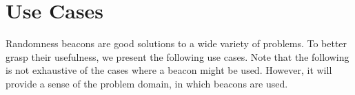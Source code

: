 \section{Use Cases}\label{sec:use_cases_of_randomness_beacons}
Randomness beacons are good solutions to a wide variety of problems.
To better grasp their usefulness, we present the following use cases.
Note that the following is not exhaustive of the cases where a beacon might be used.
However, it will provide a sense of the problem domain, in which beacons are used.

